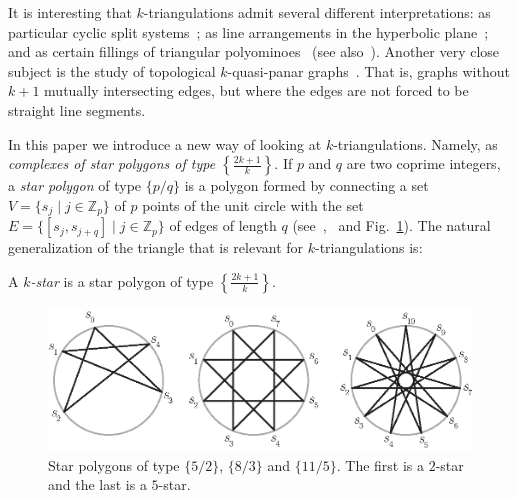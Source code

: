 \documentclass[12pt]{amsart}
\begin{document}
It is interesting that $k$-triangulations admit several different interpretations: as particular cyclic split systems~\cite{dkm-2kn-01, dkm-4n-05}; as line arrangements in the hyperbolic plane~\cite{dkm-lahp-02}; and as certain fillings of triangular polyominoes~\cite{j-gtdfssp-05} (see also~\cite{k-gdidcffs-06, r-idsfmp-07}).
Another very close subject is the study of topological $k$-quasi-panar graphs~\cite{at-mneqpg-07}. That is, graphs without $k+1$ mutually intersecting edges, but where the edges are not forced to be straight line segments.

\medskip

In this paper we introduce a new way of looking at $k$-triangulations. Namely, as \emph{complexes of star polygons of type $\left\{\frac{2k+1}{k}\right\}$}.
If $p$ and $q$ are two coprime integers, a \emph{star polygon} of type $\{p/q\}$ is a polygon formed by connecting a set $V=\{s_j\;|\; j\in\mathbb{Z}_p\}$ of $p$ points of the unit circle with the set $E=\{[s_{j},s_{j+q}] \;|\; j\in\mathbb{Z}_p\}$ of edges of length $q$ (see~\cite[pp. 36-38]{c-ig-73},~\cite[ pp. 93-95]{c-rp-73} and Fig.~\ref{starpolygons}). The natural generalization of the triangle that is relevant for $k$-triangulations is:

\begin{definition}
A \emph{$k$-star} is a star polygon of type $\left\{\frac{2k+1}{k}\right\}$.
\end{definition}

\begin{figure}[!h]
\centerline{\includegraphics[scale=1]{starpolygons.eps}}
\caption{\small{Star polygons of type $\{5/2\}$, $\{8/3\}$ and $\{11/5\}$.
The first is a $2$-star and the last is a $5$-star.
}}\label{starpolygons}
\end{figure}

\newpage
\end{document}
